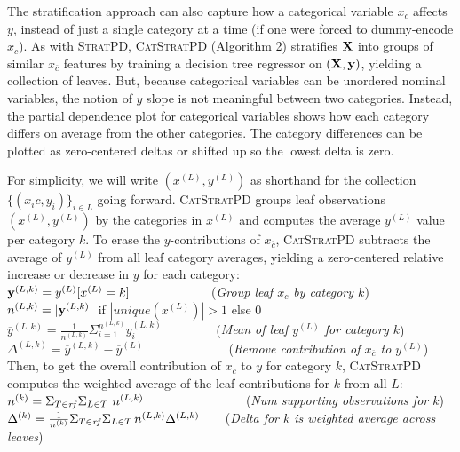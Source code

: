 \documentclass[12pt]{article}
\newcommand{\spd}{\fontfamily{cmr}\textsc{\small StratPD}}
\newcommand{\cspd}{\fontfamily{cmr}\textsc{\small CatStratPD}}
\newcommand{\xnc}{$x_{\overline{c}}$}
\begin{document}
The stratification approach can also capture how a categorical variable $x_c$ affects $y$, instead of just a single category at a time (if one were forced to dummy-encode $x_c$). As with \spd{},  \cspd{} (Algorithm 2) stratifies $\bf X$ into groups of similar \xnc{} features by training a decision tree regressor on $({\bf X}, {\bf y})$, yielding a collection of leaves. But, because categorical variables can be unordered nominal variables, the notion of $y$ slope is not meaningful between two categories.  Instead, the partial dependence plot for categorical variables shows how each category differs on average from the other categories. The category differences can be plotted as zero-centered deltas or shifted up so the lowest delta is zero.

For simplicity, we will write $(x^{(L)}, y^{(L)})$ as shorthand for the collection $\{(x_ic, y_i)\}_{i \in L}$ going forward. \cspd{} groups leaf observations $(x^{(L)}, y^{(L)})$ by the categories in $x^{(L)}$ and computes the average $y^{(L)}$ value per category $k$. To erase the $y$-contributions of \xnc{}, \cspd{} subtracts the average of $y^{(L)}$ from all leaf category averages, yielding a zero-centered relative increase or decrease in $y$ for each category:\\

\noindent ${\bf y}^{(L,k)} = y^{(L)}[x^{(L)}=k]$~~~~~~~~~~~~~({\it Group leaf $x_c$ by category $k$})\\
$n^{(L,k)} = |{\bf y}^{(L,k)}|$ if $|unique(x^{(L)})| > 1$ else 0\\
$\overline{y}^{(L,k)} = \frac{1}{n^{(L,k)}} \Sigma_{i=1}^{n^{(L,k)}} y_i^{(L,k)}$ ~~~~~~~~({\it Mean of leaf $y^{(L)}$ for category $k$})\\
$\Delta^{(L,k)} = \overline{y}^{(L,k)} - \overline{y}^{(L)}$ ~~~~~~~~~~~~~({\it Remove contribution of $x_{\overline{c}}$ to $y^{(L)}$})\\

\noindent Then, to get the overall contribution of $x_c$ to $y$ for category $k$, \cspd{} computes the weighted average of the leaf contributions for $k$ from all $L$:\\

\noindent $n^{(k)} = \Sigma_{T \in {\it rf}} \Sigma_{L \in T} ~n^{(L,k)}$~\,~~~~~~~~~~~~~~~({\it Num supporting observations for $k$})\\
$\Delta^{(k)} = \frac{1}{n^{(k)}} \Sigma_{T \in {\it rf}} \Sigma_{L \in T} \,n^{(L,k)}\Delta^{(L,k)}$~~~~({\it Delta for $k$ is weighted average across leaves})\\
\end{document}
